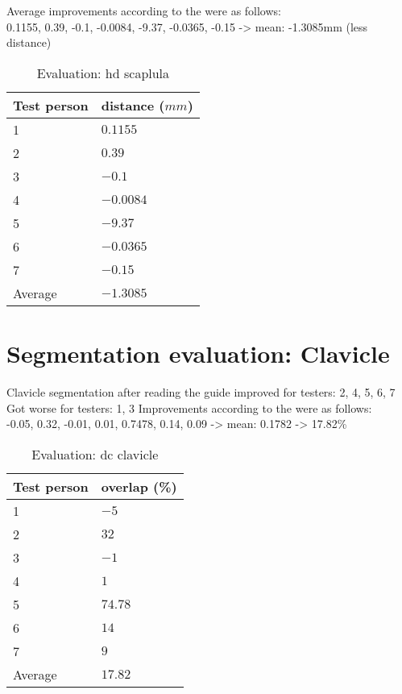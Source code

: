 \noindent
Average improvements according to the  were as follows:\\
0.1155, 0.39, -0.1, -0.0084, -9.37, -0.0365, -0.15 -> mean: -1.3085mm (less distance)
\begin{table}[ht]
	\begin{center}
		\begin{tabular}{l l}
			\textbf{Test person} & \textbf{distance ($mm$)} \\
			\hline
			1                    & $0.1155$                 \\
			2                    & $0.39$                   \\
			3                    & $-0.1$                   \\
			4                    & $-0.0084$                \\
			5                    & $-9.37$                  \\
			6                    & $-0.0365$                \\
			7                    & $-0.15$                  \\
			\hline
			Average              & $-1.3085$                \\
		\end{tabular}
		\caption{Evaluation: \acrshort{hd} scaplula}\label{tab:scapula-distance}
	\end{center}
\end{table}


\section{Segmentation evaluation: Clavicle}
Clavicle segmentation after reading the guide improved for testers:
2, 4, 5, 6, 7
Got worse for testers:
1, 3
Improvements according to the  were as follows:\\
-0.05, 0.32, -0.01, 0.01, 0.7478, 0.14, 0.09 -> mean: 0.1782 -> 17.82\%\\
\begin{table}[ht]
	\begin{center}
		\begin{tabular}{l l}
			\textbf{Test person} & \textbf{overlap (\%)} \\
			\hline
			1                    & $-5$                  \\
			2                    & $32$                  \\
			3                    & $-1$                  \\
			4                    & $1$                   \\
			5                    & $74.78$               \\
			6                    & $14$                  \\
			7                    & $9$                   \\
			\hline
			Average              & $17.82$               \\
		\end{tabular}
		\caption{Evaluation: \acrshort{dc} clavicle}\label{tab:clavicle-overlap}
	\end{center}
\end{table}

